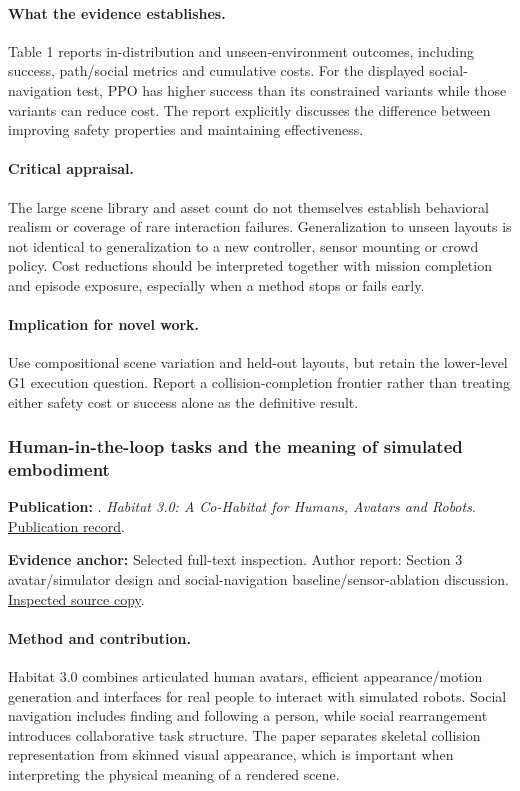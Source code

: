 \paragraph{What the evidence establishes.} Table 1 reports in-distribution and unseen-environment outcomes, including success, path/social metrics and cumulative costs. For the displayed social-navigation test, PPO has higher success than its constrained variants while those variants can reduce cost. The report explicitly discusses the difference between improving safety properties and maintaining effectiveness.

\paragraph{Critical appraisal.} The large scene library and asset count do not themselves establish behavioral realism or coverage of rare interaction failures. Generalization to unseen layouts is not identical to generalization to a new controller, sensor mounting or crowd policy. Cost reductions should be interpreted together with mission completion and episode exposure, especially when a method stops or fails early.

\paragraph{Implication for novel work.} Use compositional scene variation and held-out layouts, but retain the lower-level G1 execution question. Report a collision-completion frontier rather than treating either safety cost or success alone as the definitive result.

\subsubsection{Human-in-the-loop tasks and the meaning of simulated embodiment}\label{paper:habitat3}
\textbf{Publication:} \citet{habitat3}. \emph{Habitat 3.0: A Co-Habitat for Humans, Avatars and Robots}. \href{https://arxiv.org/abs/2310.13724}{Publication record}.

\textbf{Evidence anchor:} Selected full-text inspection. Author report: Section 3 avatar/simulator design and social-navigation baseline/sensor-ablation discussion. \href{https://arxiv.org/pdf/2310.13724}{Inspected source copy}.

\paragraph{Method and contribution.} Habitat 3.0 combines articulated human avatars, efficient appearance/motion generation and interfaces for real people to interact with simulated robots. Social navigation includes finding and following a person, while social rearrangement introduces collaborative task structure. The paper separates skeletal collision representation from skinned visual appearance, which is important when interpreting the physical meaning of a rendered scene.

